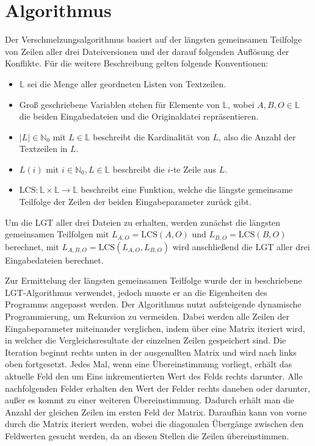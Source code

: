 \documentclass[a4paper,titlepage,12pt]{scrartcl}
\begin{document}
\section{Algorithmus}
\label{sec:algorithm}
Der Verschmelzungsalgorithmus basiert auf der längsten gemeinsamen Teilfolge von Zeilen aller drei Dateiversionen und der darauf folgenden Auflösung der Konflikte.
Für die weitere Beschreibung gelten folgende Konventionen:
\begin{itemize}
\item $\mathbb{L}$ sei die Menge aller geordneten Listen von Textzeilen.
\item Groß geschriebene Variablen stehen für Elemente von $\mathbb{L}$,
wobei $A, B, O \in \mathbb{L}$ die beiden Eingabedateien und die Originaldatei repräsentieren.
\item $|L| \in \mathbb{N}_0$ mit $L \in \mathbb{L}$ beschreibt die Kardinalität von $L$,
also die Anzahl der Textzeilen in $L$.
\item $L(i)$ mit $i \in \mathbb{N}_0, L \in \mathbb{L}$ beschreibt die $i$-te Zeile aus $L$.
\item $\mbox{LCS}: \mathbb{L} \times \mathbb{L} \rightarrow \mathbb{L}$ beschreibt eine Funktion,
welche die längste gemeinsame Teilfolge der Zeilen der beiden Eingabeparameter zurück gibt.
\end{itemize}

Um die LGT aller drei Dateien zu erhalten,
werden zunächst die längsten gemeinsamen Teilfolgen mit $L_{A,O} = \mbox{LCS}(A, O)$ und $L_{B,O} = \mbox{LCS}(B, O)$ berechnet,
mit $L_{A,B,O} = \mbox{LCS}(L_{A,O}, L_{B,O})$ wird anschließend die LGT aller drei Eingabedateien berechnet.

Zur Ermittelung der längsten gemeinsamen Teilfolge wurde der in \citet{web:eppstein} beschriebene LGT-Algorithmus verwendet,
jedoch musste er an die Eigenheiten des Programms angepasst werden.
Der Algorithmus nutzt aufsteigende dynamische Programmierung,
um Rekursion zu vermeiden.
Dabei werden alle Zeilen der Eingabeparameter miteinander verglichen,
indem über eine Matrix iteriert wird,
in welcher die Vergleichsresultate der einzelnen Zeilen gespeichert sind.
Die Iteration beginnt rechts unten in der ausgenullten Matrix und wird nach links oben fortgesetzt.
Jedes Mal, wenn eine Übereinstimmung vorliegt,
erhält das aktuelle Feld den um Eins inkrementierten Wert des Felds rechts darunter.
Alle nachfolgenden Felder erhalten den Wert der Felder rechts daneben oder darunter,
außer es kommt zu einer weiteren Übereinstimmung.
Dadurch erhält man die Anzahl der gleichen Zeilen im ersten Feld der Matrix.
Daraufhin kann von vorne durch die Matrix iteriert werden,
wobei die diagonalen Übergänge zwischen den Feldwerten gesucht werden,
da an diesen Stellen die Zeilen übereinstimmen.
\end{document}

